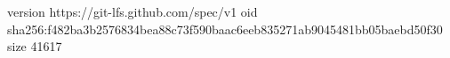 version https://git-lfs.github.com/spec/v1
oid sha256:f482ba3b2576834bea88c73f590baac6eeb835271ab9045481bb05baebd50f30
size 41617
